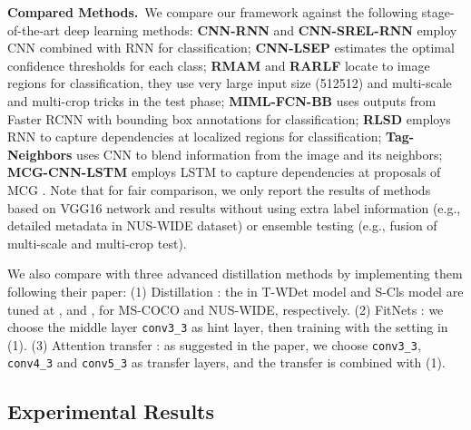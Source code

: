 \documentclass[sigconf,natbib=false]{acmart}
\begin{document}
\noindent \textbf{Compared Methods.}\ We compare our framework against the following stage-of-the-art deep learning methods: \textbf{CNN-RNN} \cite{MLIC6_cvpr16_JYJZCW} and \textbf{CNN-SREL-RNN} \cite{MLIC3_cvpr17_FTTWC} employ CNN combined with RNN for classification; \textbf{CNN-LSEP} \cite{MLIC2_cvpr17_YYJ} estimates the optimal confidence thresholds for each class; \textbf{RMAM} \cite{MLIC7_iccv17_ZTGRL} and \textbf{RARLF} \cite{MLIC17_aaai18_TZGL} locate to image regions for classification, they use very large input size (512512) and multi-scale and multi-crop tricks in the test phase; \textbf{MIML-FCN-BB} \cite{MLIC11_cvpr17_hjjy} uses outputs from Faster RCNN \cite{Faster-RCNN_nips15_skfj} with bounding box annotations for classification; \textbf{RLSD} \cite{MLIC22_tmm18_jqjcj} employs RNN to capture dependencies at localized regions for classification; \textbf{Tag-Neighbors} \cite{MLIC1_iccv15_JLL} uses CNN to blend information from the image and its neighbors; \textbf{MCG-CNN-LSTM} \cite{MLIC22_tmm18_jqjcj} employs LSTM to capture dependencies at proposals of MCG \cite{MCG_cvpr14_djysm}. Note that for fair comparison, we only report the results of methods based on VGG16 network and results without using extra label information (e.g., detailed metadata in NUS-WIDE dataset) or ensemble testing (e.g., fusion of multi-scale and multi-crop test).

We also compare with three advanced distillation methods by implementing them following their paper: (1) Distillation \cite{KD1_nips15_goj}: the  in T-WDet model and S-Cls model are tuned at ,  and ,  for MS-COCO and NUS-WIDE, respectively. (2) FitNets \cite{KD2_iclr15_ansacy}: we choose the middle layer \texttt{conv3\_3} as hint layer, then training with the setting in (1). (3) Attention transfer \cite{KD3_iclr17_sn}: as suggested in the paper, we choose \texttt{conv3\_3}, \texttt{conv4\_3} and \texttt{conv5\_3} as transfer layers, and the transfer is combined with (1).
\subsection{Experimental Results}
\end{document}
